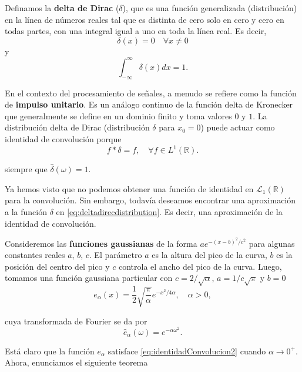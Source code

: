 \begin{multicols}{2}
Definamos la \textbf{delta de Dirac} ($\delta$), que es una función generalizada (distribución) en la línea de números reales tal que es distinta de cero solo en cero y cero en todas partes, con una integral igual a uno en toda la línea real. Es decir,
\begin{equation}
	\delta(x) = 0 \quad \forall x \neq 0
\label{eq:deltaDirac}
\end{equation}
y
\begin{equation}
	\int_{-\infty}^{\infty} \delta(x) dx = 1.
\label{eq:deltaDiracIntegral}
\end{equation}

En el contexto del procesamiento de señales, a menudo se refiere como la función de \textbf{impulso unitario}. Es un análogo continuo de la función delta de Kronecker que generalmente se define en un dominio finito y toma valores $0$ y $1$. La distribución delta de Dirac (distribución $\delta$ para $x_0 = 0$) puede actuar como identidad de convolución porque
\begin{equation}
	f * \delta = f, \quad \forall f \in L^1(\mathbb{R}).
\label{eq:deltadirecdistribution}
\end{equation}

siempre que $\hat{\delta}(\omega) = 1$.

Ya hemos visto que no podemos obtener una función de identidad en $\mathcal{L}_1(\mathbb{R})$ para la convolución. Sin embargo, todavía deseamos encontrar una aproximación a la función $\delta$ en \ref{eq:deltadirecdistribution}. Es decir, una aproximación de la identidad de convolución.

Consideremos las \textbf{funciones gaussianas} de la forma $ae^{-(x-b)^2/c^2}$ para algunas constantes reales $a$, $b$, $c$. El parámetro $a$ es la altura del pico de la curva, $b$ es la posición del centro del pico y $c$ controla el ancho del pico de la curva. Luego, tomamos una función gaussiana particular con $c = 2/\sqrt{\alpha}$, $a = 1/c\sqrt{\pi}$ y $b = 0$
\begin{equation}
	e_{\alpha}(x) = \frac{1}{2}\sqrt{\frac{\pi}{\alpha}} e^{-x^2/4\alpha}, \quad \alpha > 0,
\label{eq:gaussianfunction}
\end{equation}

cuya transformada de Fourier se da por
\begin{equation}	
	\hat{e}_{\alpha}(\omega) = e^{-\alpha \omega^2}.
\label{eq:gaussianfunctionFourier}
\end{equation}

Está claro que la función $e_{\alpha}$ satisface \ref{eq:identidadConvolucion2} cuando $\alpha \rightarrow 0^+$. Ahora, enunciamos el siguiente teorema


\end{multicols}
